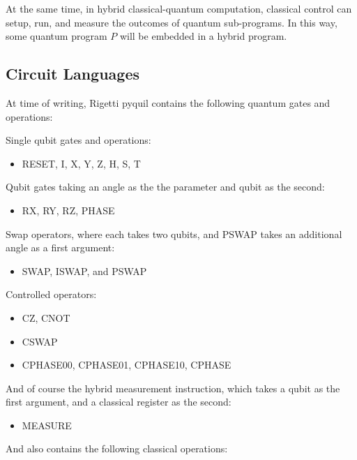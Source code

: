 \documentclass[journal]{article}
\begin{document}
At the same time, in hybrid classical-quantum computation, classical control can setup, run, and measure the outcomes of quantum sub-programs.
In this way, some quantum program $P$ will be embedded in a hybrid program.

\subsection{Circuit Languages}

At time of writing, Rigetti pyquil contains the following quantum gates and operations:

Single qubit gates and operations:

\begin{itemize}
    \item RESET, I, X, Y, Z, H, S, T
\end{itemize}

Qubit gates taking an angle as the the parameter and qubit as the second:

\begin{itemize}
    \item RX, RY, RZ, PHASE
\end{itemize}

Swap operators, where each takes two qubits, and PSWAP takes an additional angle as a first argument:

\begin{itemize}
    \item SWAP, ISWAP, and PSWAP
\end{itemize}

Controlled operators:

\begin{itemize}
    \item CZ, CNOT %
    \item CSWAP %
    \item CPHASE00, CPHASE01, CPHASE10, CPHASE %
\end{itemize}

And of course the hybrid measurement instruction, which takes a qubit as the first argument, and a classical register as the second:

\begin{itemize}
    \item MEASURE
\end{itemize}

And also contains the following classical operations:
\end{document}
